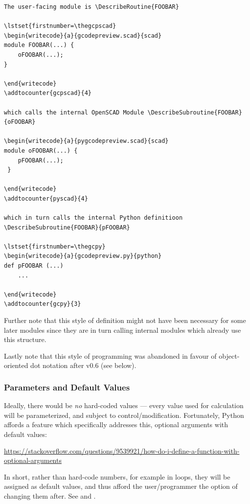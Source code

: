 \documentclass{ltxdoc}
\begin{document}
\begin{verbatim}
The user-facing module is \DescribeRoutine{FOOBAR}

\lstset{firstnumber=\thegcpscad}
\begin{writecode}{a}{gcodepreview.scad}{scad}
module FOOBAR(...) {
    oFOOBAR(...);
}

\end{writecode}
\addtocounter{gcpscad}{4}
 
which calls the internal OpenSCAD Module \DescribeSubroutine{FOOBAR}{oFOOBAR}

\begin{writecode}{a}{pygcodepreview.scad}{scad}
module oFOOBAR(...) {
    pFOOBAR(...);
 }
 
\end{writecode}
\addtocounter{pyscad}{4}

which in turn calls the internal Python definitioon \DescribeSubroutine{FOOBAR}{pFOOBAR}

\lstset{firstnumber=\thegcpy}
\begin{writecode}{a}{gcodepreview.py}{python}
def pFOOBAR (...)
    ...
    
\end{writecode}
\addtocounter{gcpy}{3}
\end{verbatim}

Further note that this style of definition might not have been necessary for some later modules since they are in turn calling internal modules which already use this structure.

Lastly note that this style of programming was abandoned in favour of object-oriented dot notation after v0.6 (see below).

\subsubsection{Parameters and Default Values}

Ideally, there would be \emph{no} hard-coded values --- every value used for calculation will be parameterized, and subject to control/modification. Fortunately, Python affords a feature which specifically addresses this, optional arguments with default values:

\noindent\url{https://stackoverflow.com/questions/9539921/how-do-i-define-a-function-with-optional-arguments}

In short, rather than hard-code numbers, for example in loops, they will be assigned as default values, and thus afford the user/programmer the option of changing them after. See  and .
\end{document}
